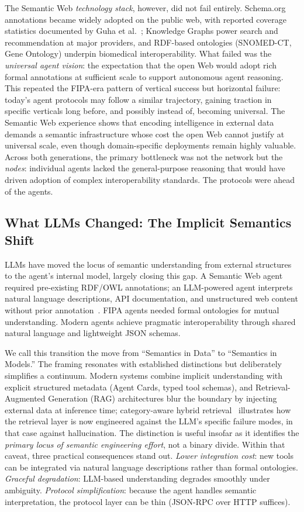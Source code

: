 \documentclass[10pt,twocolumn]{article}
\begin{document}
The Semantic Web \emph{technology stack}, however, did not fail entirely. Schema.org annotations became widely adopted on the public web, with reported coverage statistics documented by Guha et al.~\cite{Guha_2016}; Knowledge Graphs power search and recommendation at major providers, and RDF-based ontologies (SNOMED-CT, Gene Ontology) underpin biomedical interoperability. What failed was the \emph{universal agent vision}: the expectation that the open Web would adopt rich formal annotations at sufficient scale to support autonomous agent reasoning. This repeated the FIPA-era pattern of vertical success but horizontal failure: today's agent protocols may follow a similar trajectory, gaining traction in specific verticals long before, and possibly instead of, becoming universal. The Semantic Web experience shows that encoding intelligence in external data demands a semantic infrastructure whose cost the open Web cannot justify at universal scale, even though domain-specific deployments remain highly valuable.  Across both generations, the primary bottleneck was not the network but the \emph{nodes}: individual agents lacked the general-purpose reasoning that would have driven adoption of complex interoperability standards. The protocols were ahead of the agents.

\subsection{What LLMs Changed: The Implicit Semantics Shift}

LLMs have moved the locus of semantic understanding from external structures to the agent's internal model, largely closing this gap. A Semantic Web agent required pre-existing RDF/OWL annotations; an LLM-powered agent interprets natural language descriptions, API documentation, and unstructured web content without prior annotation~\cite{Yao_2023, Schick_2023}. FIPA agents needed formal ontologies for mutual understanding. Modern agents achieve pragmatic interoperability through shared natural language and lightweight JSON schemas.

We call this transition the move from ``Semantics in Data'' to ``Semantics in Models.''  The framing resonates with established distinctions but deliberately simplifies a continuum. Modern systems combine implicit understanding with explicit structured metadata (Agent Cards, typed tool schemas), and Retrieval-Augmented Generation (RAG) architectures blur the boundary by injecting external data at inference time; category-aware hybrid retrieval~\cite{Petrova_CARRAG_2025} illustrates how the retrieval layer is now engineered against the LLM's specific failure modes, in that case against hallucination. The distinction is useful insofar as it identifies the \emph{primary locus of semantic engineering effort}, not a binary divide. Within that caveat, three practical consequences stand out.  \emph{Lower integration cost}: new tools can be integrated via natural language descriptions rather than formal ontologies.  \emph{Graceful degradation}: LLM-based understanding degrades smoothly under ambiguity.  \emph{Protocol simplification}: because the agent handles semantic interpretation, the protocol layer can be thin (JSON-RPC over HTTP suffices).
\end{document}

